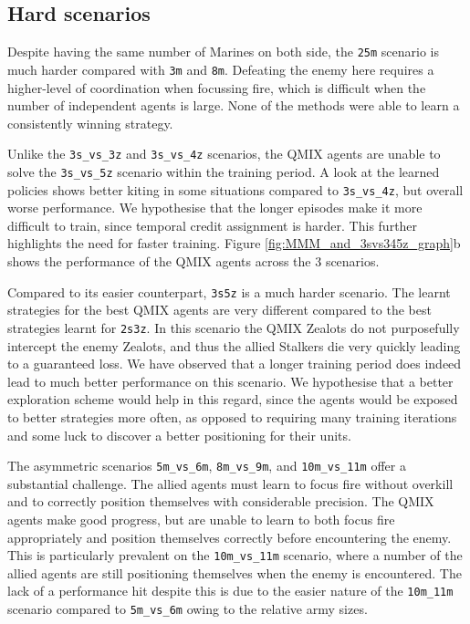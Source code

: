 \subsection{Hard scenarios}


Despite having the same number of Marines on both side, the \texttt{25m} scenario is much harder compared with \texttt{3m} and \texttt{8m}. Defeating the enemy here requires a higher-level of coordination when focussing fire, which is difficult when the number of independent agents is large. None of the methods were able to learn a consistently winning strategy.

Unlike the \texttt{3s\_vs\_3z} and \texttt{3s\_vs\_4z} scenarios, the QMIX agents are unable to solve the \texttt{3s\_vs\_5z} scenario within the training period. A look at the learned policies shows better kiting in some situations compared to \texttt{3s\_vs\_4z}, but overall worse performance. We hypothesise that the longer episodes make it more difficult to train, since temporal credit assignment is harder. This further highlights the need for faster training. Figure \ref{fig:MMM_and_3svs345z_graph}b shows the performance of the QMIX agents across the 3 scenarios.

Compared to its easier counterpart, \texttt{3s5z} is a much harder scenario. The learnt strategies for the best QMIX agents are very different compared to the best strategies learnt for \texttt{2s3z}. In this scenario the QMIX Zealots do not purposefully intercept the enemy Zealots, and thus the allied Stalkers die very quickly leading to a guaranteed loss. We have observed that a longer training period does indeed lead to much better performance on this scenario. %
We hypothesise that a better exploration scheme would help in this regard, since the agents would be exposed to better strategies more often, as opposed to requiring many training iterations and some luck to discover a better positioning for their units. 

The asymmetric scenarios \texttt{5m\_vs\_6m}, \texttt{8m\_vs\_9m}, and \texttt{10m\_vs\_11m} offer a substantial challenge. The allied agents must learn to focus fire without overkill and to correctly position themselves with considerable precision. The QMIX agents make good progress, but are unable to learn to both focus fire appropriately and position themselves correctly before encountering the enemy. This is particularly prevalent on the \texttt{10m\_vs\_11m} scenario, where a number of the allied agents are still positioning themselves when the enemy is encountered. The lack of a performance hit despite this is due to the easier nature of the \texttt{10m\_11m} scenario compared to \texttt{5m\_vs\_6m} owing to the relative army sizes. 

